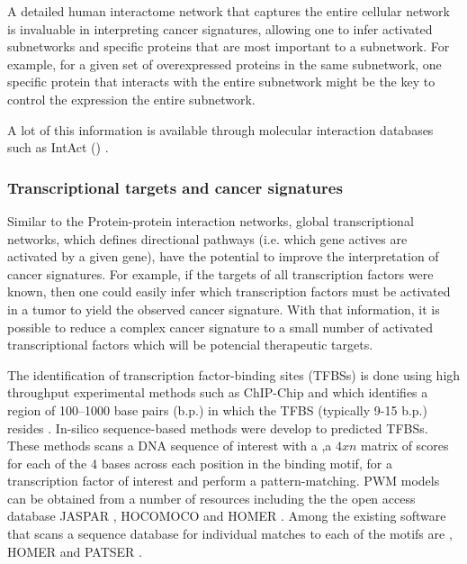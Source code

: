  A detailed human interactome network that captures the entire cellular network is invaluable in interpreting cancer signatures, allowing one to infer activated subnetworks and specific proteins that are most important to a subnetwork. For example, for a given set of overexpressed proteins in the same subnetwork, one specific protein that interacts with the entire subnetwork might be the key to control the expression the entire subnetwork.

 A lot of this information is available through molecular interaction databases such as IntAct () \cite{orchard2013mintact}.

\subsubsection{Transcriptional targets and cancer signatures}

Similar to the Protein-protein interaction networks, global transcriptional networks, which defines directional pathways (i.e. which gene actives are activated by a given gene), have the potential to improve the interpretation of cancer signatures. For example, if the targets of all transcription factors  were known, then one could easily infer which transcription factors must be activated in a tumor to yield the observed cancer signature. With that information, it is possible to reduce a complex cancer signature to a small number of activated transcriptional factors which will be potencial therapeutic targets.

The identification of transcription factor-binding sites (TFBSs) is done using high throughput experimental methods  such as ChIP-Chip and   which identifies a region of 100–1000
base pairs (b.p.) in which the TFBS
(typically 9-15 b.p.) resides \cite{jayaram2016evaluating}.
In-silico  sequence-based methods were develop to predicted TFBSs. These methods scans a DNA sequence of interest
with a ,a $4 x n$ matrix of
scores for each of the 4 bases across each position in the
binding motif, for a transcription factor of interest and perform a pattern-matching.
PWM models can be obtained from a number of resources including the the open access database JASPAR \cite{portales2009jaspar}, HOCOMOCO \cite{kulakovskiy2013hocomoco} and HOMER \cite{heinz2010simple}. Among the existing  software that scans a sequence database for individual matches to each of the motifs are  \cite{grant2011fimo}, HOMER \cite{heinz2010simple} and PATSER \cite{turatsinze2008using}.

